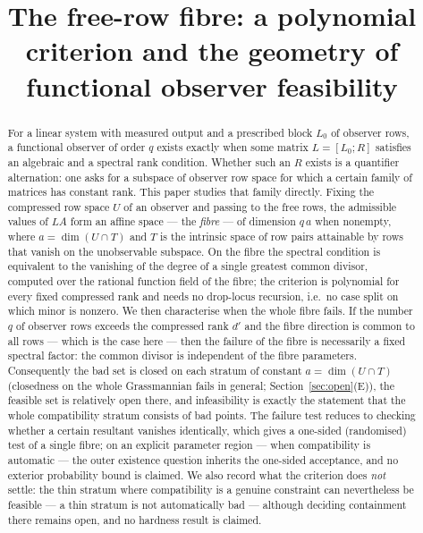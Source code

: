 \documentclass[journal]{IEEEtran}
\theoremstyle{plainn}
\theoremstyle{remark}
\begin{document}
\title{The free-row fibre: a polynomial criterion and the geometry of
functional observer feasibility}
\author{}
\maketitle

\begin{abstract}
For a linear system with measured output and a prescribed block $L_0$ of observer rows, a functional
observer of order $q$ exists exactly when some matrix $L=[L_0;R]$ satisfies an algebraic and a
spectral rank condition. Whether such an $R$ exists is a quantifier alternation: one asks for a
subspace of observer row space for which a certain family of matrices has constant rank. This paper
studies that family directly. Fixing the compressed row space $U$ of an observer and passing to the
free rows, the admissible values of $LA$ form an affine space --- the \emph{fibre} --- of dimension
$q\,a$ when nonempty, where $a=\dim(U\cap T)$ and $T$ is the intrinsic space of row pairs attainable by rows
that vanish on the unobservable subspace. On the fibre the spectral condition is equivalent to the
vanishing of the degree of a single greatest common divisor, computed over the rational function field
of the fibre; the criterion is polynomial for every fixed compressed rank and needs no drop-locus
recursion, i.e.\ no case split on which minor is nonzero. We then characterise when the whole fibre
fails. If the number $q$ of observer rows
exceeds the compressed rank $d'$ and the fibre direction is common to all rows --- which is the case
here --- then the failure of the fibre is necessarily a fixed spectral factor: the common divisor is
independent of the fibre parameters. Consequently the bad set is closed on each stratum
of constant $a=\dim(U\cap T)$ (closedness on the whole Grassmannian fails in general;
Section~\ref{sec:open}(E)), the feasible set is
relatively open there, and infeasibility is exactly the statement that the whole compatibility stratum
consists of bad points. The failure test reduces to checking whether a
certain resultant vanishes identically, which gives a one-sided (randomised) test of a single fibre; on
an explicit parameter region --- when compatibility is automatic --- the outer existence question
inherits the one-sided acceptance, and no exterior probability bound is claimed. We also record what the criterion does \emph{not} settle: the thin stratum where
compatibility is a genuine constraint can nevertheless be feasible --- a thin stratum is not
automatically bad --- although deciding containment there remains open, and no hardness result is claimed.
\end{abstract}
\end{document}

